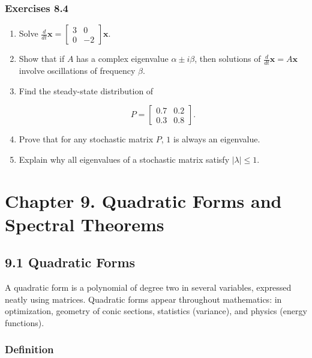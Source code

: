 \documentclass[
  12pt,
  a4paper,
]{article}
\let\oldsection\section
\renewcommand{\section}{\clearpage\oldsection}
\begin{document}
\subsubsection{Exercises 8.4}\label{exercises-84}

\begin{enumerate}
\def\labelenumi{\arabic{enumi}.}
\item
  Solve
  \(\tfrac{d}{dt}\mathbf{x} = \begin{bmatrix} 3 & 0 \\ 0 & -2 \end{bmatrix}\mathbf{x}\).
\item
  Show that if \(A\) has a complex eigenvalue \(\alpha \pm i\beta\),
  then solutions of \(\tfrac{d}{dt}\mathbf{x} = A\mathbf{x}\) involve
  oscillations of frequency \(\beta\).
\item
  Find the steady-state distribution of

  \[P = \begin{bmatrix} 0.7 & 0.2 \\ 0.3 & 0.8 \end{bmatrix}.\]
\item
  Prove that for any stochastic matrix \(P\), \(1\) is always an
  eigenvalue.
\item
  Explain why all eigenvalues of a stochastic matrix satisfy
  \(|\lambda| \leq 1\).
\end{enumerate}

\section{Chapter 9. Quadratic Forms and Spectral
Theorems}\label{chapter-9-quadratic-forms-and-spectral-theorems}

\subsection{9.1 Quadratic Forms}\label{91-quadratic-forms}

A quadratic form is a polynomial of degree two in several variables,
expressed neatly using matrices. Quadratic forms appear throughout
mathematics: in optimization, geometry of conic sections, statistics
(variance), and physics (energy functions).

\subsubsection{Definition}\label{definition-8}
\end{document}
